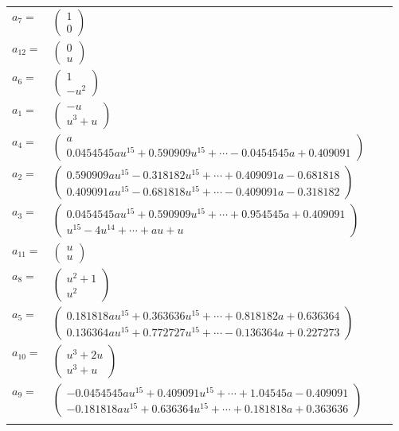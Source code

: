 \documentclass[1p]{elsarticle_modified}
\theoremstyle{definition}
\begin{document}
\begin{tabular}{m{7pt} m{180pt} m{7pt} m{180pt} }
\flushright $a_{7}=$&$\begin{pmatrix}1\\0\end{pmatrix}$ \\
\flushright $a_{12}=$&$\begin{pmatrix}0\\u\end{pmatrix}$ \\
\flushright $a_{6}=$&$\begin{pmatrix}1\\- u^2\end{pmatrix}$ \\
\flushright $a_{1}=$&$\begin{pmatrix}- u\\u^3+u\end{pmatrix}$ \\
\flushright $a_{4}=$&$\begin{pmatrix}a\\0.0454545 a u^{15}+0.590909 u^{15}+\cdots-0.0454545 a+0.409091\end{pmatrix}$ \\
\flushright $a_{2}=$&$\begin{pmatrix}0.590909 a u^{15}-0.318182 u^{15}+\cdots+0.409091 a-0.681818\\0.409091 a u^{15}-0.681818 u^{15}+\cdots-0.409091 a-0.318182\end{pmatrix}$ \\
\flushright $a_{3}=$&$\begin{pmatrix}0.0454545 a u^{15}+0.590909 u^{15}+\cdots+0.954545 a+0.409091\\u^{15}-4 u^{14}+\cdots+a u+u\end{pmatrix}$ \\
\flushright $a_{11}=$&$\begin{pmatrix}u\\u\end{pmatrix}$ \\
\flushright $a_{8}=$&$\begin{pmatrix}u^2+1\\u^2\end{pmatrix}$ \\
\flushright $a_{5}=$&$\begin{pmatrix}0.181818 a u^{15}+0.363636 u^{15}+\cdots+0.818182 a+0.636364\\0.136364 a u^{15}+0.772727 u^{15}+\cdots-0.136364 a+0.227273\end{pmatrix}$ \\
\flushright $a_{10}=$&$\begin{pmatrix}u^3+2 u\\u^3+u\end{pmatrix}$ \\
\flushright $a_{9}=$&$\begin{pmatrix}-0.0454545 a u^{15}+0.409091 u^{15}+\cdots+1.04545 a-0.409091\\-0.181818 a u^{15}+0.636364 u^{15}+\cdots+0.181818 a+0.363636\end{pmatrix}$\\&\end{tabular}
\end{document}
